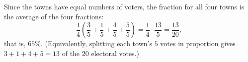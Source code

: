 Since the towns have equal numbers of voters, the fraction for all four towns is the average of the four fractions:
\[\dfrac14\left(\dfrac35+\dfrac15+\dfrac45+\dfrac55\right)=\dfrac14\cdot\dfrac{13}{5}=\boxed{\dfrac{13}{20}},\]
that is, $65\%$. (Equivalently, splitting each town's $5$ votes in proportion gives $3+1+4+5=13$ of the $20$ electoral votes.)
